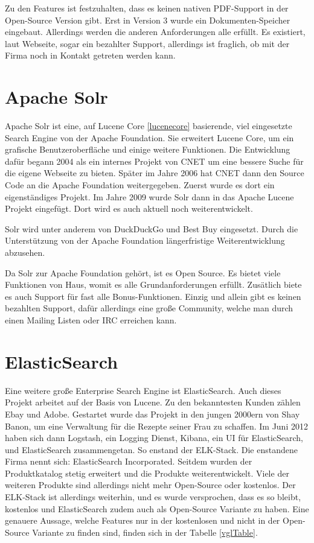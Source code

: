 Zu den Features ist festzuhalten, dass es keinen nativen PDF-Support in der Open-Source Version gibt. Erst in Version 3 wurde ein Dokumenten-Speicher eingebaut. Allerdings werden die anderen Anforderungen alle erfüllt. Es existiert, laut Webseite, sogar ein bezahlter Support, allerdings ist fraglich, ob mit der Firma noch in Kontakt getreten werden kann. \cite{SphinxTechnologiesInc.2019}

\section{Apache Solr}
\label{solr}

Apache Solr ist eine, auf Lucene Core \ref{lucenecore} basierende, viel eingesetzte Search Engine von der Apache Foundation. Sie erweitert Lucene Core, um ein grafische Benutzeroberfläche und einige weitere Funktionen. 
Die Entwicklung dafür begann 2004 als ein internes Projekt von CNET um eine bessere Suche für die eigene Webseite zu bieten. Später im Jahre 2006 hat CNET dann den Source Code an die Apache Foundation weitergegeben. Zuerst wurde es dort ein eigenständiges Projekt. Im Jahre 2009 wurde Solr dann in das Apache Lucene Projekt eingefügt. Dort wird es auch aktuell noch weiterentwickelt. \cite{Wikipedia.2019b}

Solr wird unter anderem von DuckDuckGo und Best Buy eingesetzt. Durch die Unterstützung von der Apache Foundation längerfristige Weiterentwicklung abzusehen. 

Da Solr zur Apache Foundation gehört, ist es Open Source. Es bietet viele Funktionen von Haus, womit es alle Grundanforderungen erfüllt. Zusätlich biete es auch Support für fast alle Bonus-Funktionen. Einzig und allein gibt es keinen bezahlten Support, dafür allerdings eine große Community, welche man durch einen Mailing Listen oder IRC erreichen kann. \cite{TheApacheSoftwareFoundation.2019}

\section{ElasticSearch}
\label{elasticsearch}

Eine weitere große Enterprise Search Engine ist ElasticSearch. Auch dieses Projekt arbeitet auf der Basis von Lucene. Zu den bekanntesten Kunden zählen Ebay und Adobe. Gestartet wurde das Projekt in den jungen 2000ern von Shay Banon, um eine Verwaltung für die Rezepte seiner Frau zu schaffen. Im Juni 2012 haben sich dann Logstash, ein Logging Dienst, Kibana, ein UI für ElasticSearch, und ElasticSearch zusammengetan. So enstand der ELK-Stack. Die enstandene Firma nennt sich: ElasticSearch Incorporated. Seitdem wurden der Produktkatalog stetig erweitert und die Produkte weiterentwickelt. Viele der weiteren Produkte sind allerdings nicht mehr Open-Source oder kostenlos. Der ELK-Stack ist allerdings weiterhin, und es wurde versprochen, dass es so bleibt, kostenlos und ElasticSearch zudem auch als Open-Source Variante zu haben. Eine genauere Aussage, welche Features nur in der kostenlosen und nicht in der Open-Source Variante zu finden sind, finden sich in der Tabelle \ref{vglTable}.

